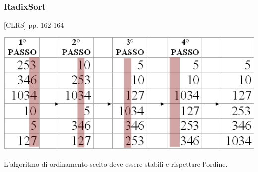 \documentclass{article}
\begin{document}
\subsubsection{\texorpdfstring{{}}{}}\label{h.f4yzmjxt5mx}

\hypertarget{h.ixohzh3ypk6v}{\subsubsection{\texorpdfstring{{RadixSort}}{RadixSort}}\label{h.ixohzh3ypk6v}}

{{[}CLRS{]} pp. 162-164}

{}

{\includegraphics{images/image540.png}}

{L'algoritmo di ordinamento scelto deve essere stabili e rispettare
l'ordine.}

{}

\protect\hypertarget{t.9351034389c7df45f2289244d1a6b5684029a393}{}{}\protect\hypertarget{t.28}{}{}
\end{document}
